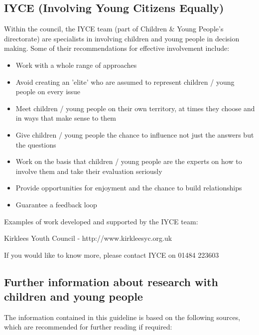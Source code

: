 \subsection{IYCE (Involving Young Citizens Equally)}

Within the council, the IYCE team (part of Children \& Young People’s directorate) are specialists in involving children and young people in decision making. Some of their recommendations for effective involvement include:

\begin{itemize}
	\item Work with a whole range of approaches

	\item Avoid creating an 'elite' who are assumed to represent children / young people on every issue

	\item Meet children / young people on their own territory, at times they choose and in ways that make sense to them

	\item Give children / young people the chance to influence not just the answers but the questions

	\item Work on the basis that children / young people are the experts on how to involve them and take their evaluation seriously

	\item Provide opportunities for enjoyment and the chance to build relationships

	\item Guarantee a feedback loop

\end{itemize}

Examples of work developed and supported by the IYCE team:

Kirklees Youth Council - http://www.kirkleesyc.org.uk

If you would like to know more, please contact IYCE on 01484 223603

\subsection{Further information about research with children and young people}

The information contained in this guideline is based on the following sources, which are recommended for further reading if required:

